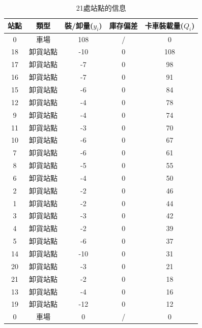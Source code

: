 \begin{table}[H]
    \begin{center}
        \begin{tabular}{ccccc}
            \hline
            站點 & 類型 & 裝/卸量(\(y_i\)) & 庫存偏差 & 卡車裝載量(\(Q_i\))\\
            \hline
            0 & 車場 & 108 & / & 0\\
            18 & 卸貨站點 & -10 & 0 & 108\\
            17 & 卸貨站點 & -7 & 0 & 98\\
            16 & 卸貨站點 & -7 & 0 & 91\\
            15 & 卸貨站點 & -6 & 0 & 84\\
            12 & 卸貨站點 & -4 & 0 & 78\\
            9 & 卸貨站點 & -4 & 0 & 74\\
            11 & 卸貨站點 & -3 & 0 & 70\\
            10 & 卸貨站點 & -6 & 0 & 67\\
            7 & 卸貨站點 & -6 & 0 & 61\\
            8 & 卸貨站點 & -5 & 0 & 55\\
            6 & 卸貨站點 & -4 & 0 & 50\\
            2 & 卸貨站點 & -2 & 0 & 46\\
            1 & 卸貨站點 & -2 & 0 & 44\\
            3 & 卸貨站點 & -3 & 0 & 42\\
            4 & 卸貨站點 & -2 & 0 & 39\\
            5 & 卸貨站點 & -6 & 0 & 37\\
            14 & 卸貨站點 & -10 & 0 & 31\\
            20 & 卸貨站點 & -3 & 0 & 21\\
            21 & 卸貨站點 & -2 & 0 & 18\\
            13 & 卸貨站點 & -4 & 0 & 16\\
            19 & 卸貨站點 & -12 & 0 & 12\\
            0 & 車場 & 0 & / & 0\\
        \hline
        \end{tabular}
    \end{center}
    \caption{21處站點的信息}
\end{table}